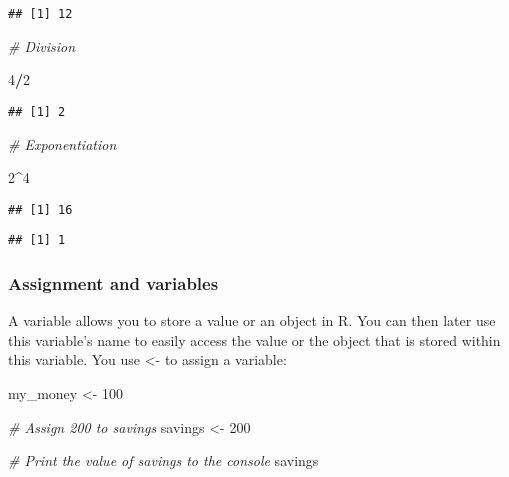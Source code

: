 \documentclass[]{article}
\newenvironment{Shaded}{\begin{snugshade}}{\end{snugshade}}
\newcommand{\DecValTok}[1]{\textcolor[rgb]{0.00,0.00,0.81}{#1}}
\newcommand{\StringTok}[1]{\textcolor[rgb]{0.31,0.60,0.02}{#1}}
\newcommand{\CommentTok}[1]{\textcolor[rgb]{0.56,0.35,0.01}{\textit{#1}}}
\newcommand{\OperatorTok}[1]{\textcolor[rgb]{0.81,0.36,0.00}{\textbf{#1}}}
\newcommand{\NormalTok}[1]{#1}
\begin{document}
\begin{verbatim}
## [1] 12
\end{verbatim}

\begin{Shaded}
\begin{Highlighting}[]
\CommentTok{# Division}

\DecValTok{4}\OperatorTok{/}\DecValTok{2}
\end{Highlighting}
\end{Shaded}

\begin{verbatim}
## [1] 2
\end{verbatim}

\begin{Shaded}
\begin{Highlighting}[]
\CommentTok{# Exponentiation}

\DecValTok{2}\OperatorTok{^}\DecValTok{4}
\end{Highlighting}
\end{Shaded}

\begin{verbatim}
## [1] 16
\end{verbatim}

\begin{Shaded}
\end{Shaded}

\begin{verbatim}
## [1] 1
\end{verbatim}

\subsubsection{Assignment and variables}\label{assignment-and-variables}

A variable allows you to store a value or an object in R. You can then
later use this variable's name to easily access the value or the object
that is stored within this variable. You use \textless{}- to assign a
variable:

my\_money \textless{}- 100

\begin{Shaded}
\begin{Highlighting}[]
\CommentTok{# Assign 200 to savings}
\NormalTok{savings <-}\StringTok{ }\DecValTok{200}

\CommentTok{# Print the value of savings to the console}
\NormalTok{savings}
\end{Highlighting}
\end{Shaded}
\end{document}
